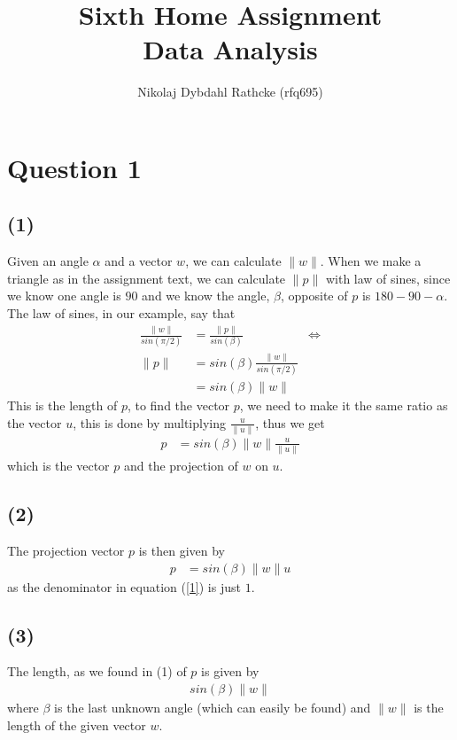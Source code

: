 \documentclass[a4paper]{article}
\author{Nikolaj Dybdahl Rathcke (rfq695)}
\title{Sixth Home Assignment \\ Data Analysis}
\begin{document}
\maketitle
\section*{Question 1}
\subsection*{(1)}
Given an angle $\alpha$ and a vector $w$, we can calculate $\| w \|$. When we make a triangle as in the assignment text, we can calculate $\|p\|$ with law of sines, since we know one angle is $90$ and we know the angle, $\beta$, opposite of $p$ is $180-90-\alpha$. The law of sines, in our example, say that
\begin{align*}
\frac{\| w\|}{sin(\pi/2)}&=\frac{\| p\|}{sin(\beta)} &\Leftrightarrow\\
\| p\|&=sin(\beta)\frac{\|w\|}{sin(\pi/2)} \\
&=sin(\beta)\|w\|
\end{align*}
This is the length of $p$, to find the vector $p$, we need to make it the same ratio as the vector $u$, this is done by multiplying $\frac{u}{\|u\|}$, thus we get
\begin{align}
p&=sin(\beta)\|w\|\frac{u}{\|u\|}
\label{1}
\end{align}
which is the vector $p$ and the projection of $w$ on $u$.

\subsection*{(2)}
The projection vector $p$ is then given by
\begin{align*}
p&=sin(\beta)\|w\|u
\end{align*}
as the denominator in equation (\ref{1}) is just $1$.

\subsection*{(3)}
The length, as we found in (1) of $p$ is given by 
\begin{align*}
sin(\beta)\|w\|
\end{align*}
where $\beta$ is the last unknown angle (which can easily be found) and $\|w\|$ is the length of the given vector $w$.

\newpage
\end{document}
